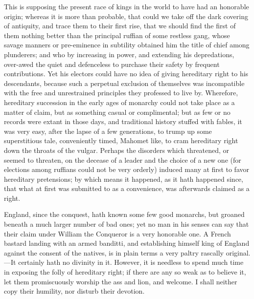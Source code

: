 \documentclass[12pt, twocolumn]{book}
\begin{document}
    This is supposing the present race of kings in the world to have had an honorable origin; whereas it is more than probable, that could we take off the dark covering of antiquity, and trace them to their first rise, that we should find the first of them nothing better than the principal ruffian of some restless gang, whose savage manners or pre-eminence in subtility obtained him the title of chief among plunderers; and who by increasing in power, and extending his depredations, over-awed the quiet and defenceless to purchase their safety by frequent contributions. Yet his electors could have no idea of giving hereditary right to his descendants, because such a perpetual exclusion of themselves was incompatible with the free and unrestrained principles they professed to live by. Wherefore, hereditary succession in the early ages of monarchy could not take place as a matter of claim, but as something casual or complimental; but as few or no records were extant in those days, and traditional history stuffed with fables, it was very easy, after the lapse of a few generations, to trump up some superstitious tale, conveniently timed, Mahomet like, to cram hereditary right down the throats of the vulgar. Perhaps the disorders which threatened, or seemed to threaten, on the decease of a leader and the choice of a new one (for elections among ruffians could not be very orderly) induced many at first to favor hereditary pretensions; by which means it happened, as it hath happened since, that what at first was submitted to as a convenience, was afterwards claimed as a right.

    England, since the conquest, hath known some few good monarchs, but groaned beneath a much larger number of bad ones; yet no man in his senses can say that their claim under William the Conqueror is a very honorable one. A French bastard landing with an armed banditti, and establishing himself king of England against the consent of the natives, is in plain terms a very paltry rascally original.—It certainly hath no divinity in it. However, it is needless to spend much time in exposing the folly of hereditary right; if there are any so weak as to believe it, let them promiscuously worship the ass and lion, and welcome. I shall neither copy their humility, nor disturb their devotion.
\end{document}
